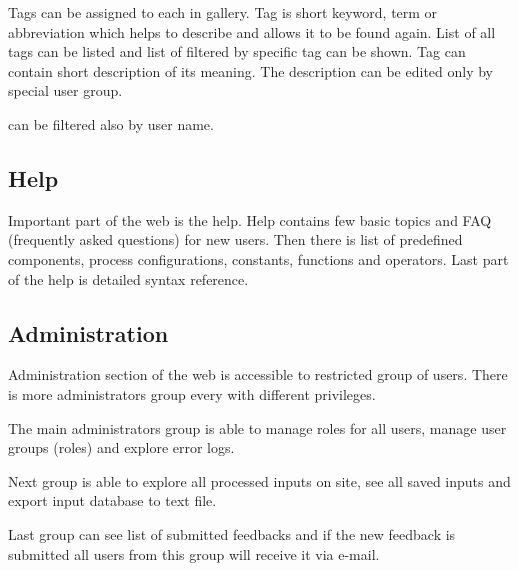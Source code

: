 Tags can be assigned to each \lsystem in gallery.
Tag is short keyword, term or abbreviation which helps to describe \lsystem and allows it to be found again.
List of all tags can be listed and list of \lsystems filtered by specific tag can be shown.
Tag can contain short description of its meaning.
The description can be edited only by special user group.

\lsystems can be filtered also by user name.


\subsection{Help}

Important part of the web is the help.
Help contains few basic topics and FAQ (frequently asked questions) for new users.
Then there is list of predefined components, process configurations, constants, functions and operators.
Last part of the help is detailed syntax reference.


\subsection{Administration}

Administration section of the web is accessible to restricted group of users.
There is more administrators group every with different privileges.

The main administrators group is able to manage roles for all users, manage user groups (roles) and explore error logs.

Next group is able to explore all processed inputs on site, see all saved inputs and export input database to text file.

Last group can see list of submitted feedbacks and if the new feedback is submitted all users from this group will receive it via e-mail.




















